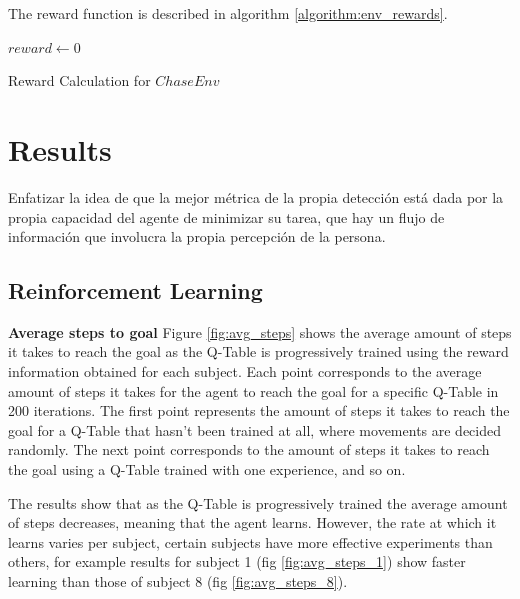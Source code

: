 \documentclass[journal]{IEEEtran}
\begin{document}
{{The reward function is described in algorithm \ref{algorithm:env_rewards}.

\begin{algorithm}
\SetAlgoLined
\DontPrintSemicolon
$reward \leftarrow 0$\\
\label{algorithm:env_rewards}
\caption{Reward Calculation for $ChaseEnv$}
\end{algorithm}
}
}



\section{Results}

Enfatizar la idea de que la mejor métrica de la propia detección está dada por la propia capacidad del agente de minimizar su tarea, que hay un flujo de información que involucra la propia percepción de la persona.

\subsection{Reinforcement Learning}

\textbf{Average steps to goal}
Figure \ref{fig:avg_steps} shows the average amount of steps it takes to reach the goal as the Q-Table is progressively trained using the reward information obtained for each subject. Each point corresponds to the average amount of steps it takes for the agent to reach the goal for a specific Q-Table in 200 iterations. The first point represents the amount of steps it takes to reach the goal for a Q-Table that hasn't been trained at all, where movements are decided randomly. The next point corresponds to the amount of steps it takes to reach the goal using a Q-Table trained with one experience, and so on.

The results show that as the Q-Table is progressively trained the average amount of steps decreases, meaning that the agent learns. However, the rate at which it learns varies per subject, certain subjects have more effective experiments than others, for example results for subject 1 (fig \ref{fig:avg_steps_1}) show faster learning than those of subject 8 (fig \ref{fig:avg_steps_8}).
\end{document}
